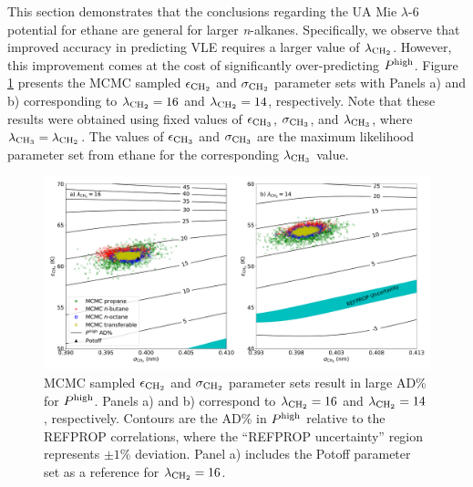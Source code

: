 \documentclass[preprint,letterpaper,floatfix,citeautoscript,aip,jcp]{revtex4-1}
\begin{document}
This section demonstrates that the conclusions regarding the UA Mie $\lambda$-6 potential for ethane are general for larger \textit{n}-alkanes. Specifically, we observe that improved accuracy in predicting VLE requires a larger value of $\lambda_{\rm CH_2}$. However, this improvement comes at the cost of significantly over-predicting $P^{\rm high}$. Figure \ref{fig:MCMC_Mie_14_16_propane_butane_octane} presents the MCMC sampled $\epsilon_{\rm CH_2}$ and $\sigma_{\rm CH_2}$ parameter sets with Panels a) and b) corresponding to $\lambda_{\rm CH_2} = 16$ and $\lambda_{\rm CH_2} = 14$, respectively. Note that these results were obtained using fixed values of $\epsilon_{\rm CH_3}$, $\sigma_{\rm CH_3}$, and $\lambda_{\rm CH_3}$, where $\lambda_{\rm CH_3} = \lambda_{\rm CH_2}$. The values of $\epsilon_{\rm CH_3}$ and $\sigma_{\rm CH_3}$ are the maximum likelihood parameter set from ethane for the corresponding $\lambda_{\rm CH_3}$ value.


\begin{figure}[htb!]
	\centering
	\includegraphics[width=6.4in]{MCMC_Mie_14_16_propane_butane_octane}
	\caption{MCMC sampled $\epsilon_{\rm CH_2}$ and $\sigma_{\rm CH_2}$ parameter sets result in large AD\% for $P^{\rm high}$. Panels a) and b) correspond to $\lambda_{\rm CH_2} = 16$ and $\lambda_{\rm CH_2} = 14$, respectively. Contours are the AD\% in $P^{\rm high}$ relative to the REFPROP correlations, where the ``REFPROP uncertainty'' region represents $\pm 1$\% deviation. Panel a) includes the Potoff parameter set as a reference for $\lambda_{\rm CH_2} = 16$.}
	\label{fig:MCMC_Mie_14_16_propane_butane_octane}
\end{figure} 
\end{document}
